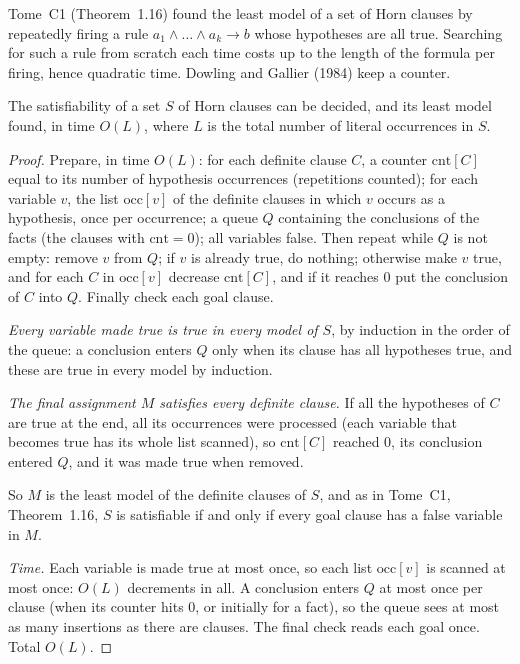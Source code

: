 Tome~C1 (Theorem~1.16) found the least model of a set of Horn clauses by repeatedly firing a rule $a_1\land\dots\land a_k\to b$ whose
hypotheses are all true. Searching for such a rule from scratch each time costs up to the length of the formula per firing, hence
quadratic time. Dowling and Gallier (1984) keep a counter.

\begin{theorem}\label{thm:hornlinear}
The satisfiability of a set $S$ of Horn clauses can be decided, and its least model found, in time $O(L)$, where $L$ is the total
number of literal occurrences in $S$.
\end{theorem}
\begin{proof}
Prepare, in time $O(L)$: for each definite clause $C$, a counter $\mathrm{cnt}[C]$ equal to its number of hypothesis occurrences
(repetitions counted); for each variable $v$, the list $\mathrm{occ}[v]$ of the definite clauses in which $v$ occurs as a hypothesis, once
per occurrence; a queue $Q$ containing the conclusions of the facts (the clauses with $\mathrm{cnt}=0$); all variables false. Then
repeat while $Q$ is not empty: remove $v$ from $Q$; if $v$ is already true, do nothing; otherwise make $v$ true, and for each $C$ in
$\mathrm{occ}[v]$ decrease $\mathrm{cnt}[C]$, and if it reaches $0$ put the conclusion of $C$ into $Q$. Finally check each goal clause.

\emph{Every variable made true is true in every model of $S$}, by induction in the order of the queue: a conclusion enters $Q$ only when
its clause has all hypotheses true, and these are true in every model by induction.

\emph{The final assignment $M$ satisfies every definite clause.} If all the hypotheses of $C$ are true at the end, all its occurrences
were processed (each variable that becomes true has its whole list scanned), so $\mathrm{cnt}[C]$ reached $0$, its conclusion entered $Q$, and it was made true when removed.

So $M$ is the least model of the definite clauses of $S$, and as in Tome~C1, Theorem~1.16, $S$ is satisfiable if and only if every goal
clause has a false variable in $M$.

\emph{Time.} Each variable is made true at most once, so each list $\mathrm{occ}[v]$ is scanned at most once: $O(L)$ decrements in all.
A conclusion enters $Q$ at most once per clause (when its counter hits $0$, or initially for a fact), so the queue sees at most as many
insertions as there are clauses. The final check reads each goal once. Total $O(L)$.
\end{proof}

